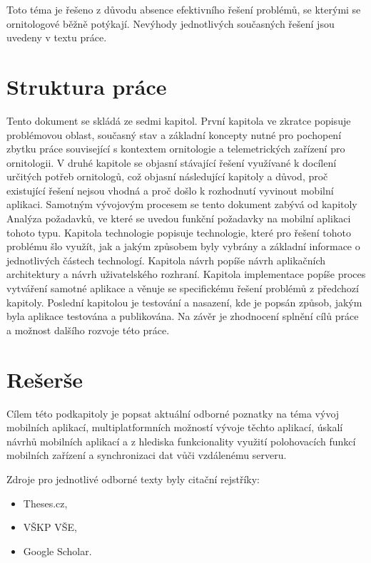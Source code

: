 Toto téma je řešeno z důvodu absence efektivního řešení problémů, se kterými se ornitologové běžně potýkají. Nevýhody jednotlivých současných řešení jsou uvedeny v textu práce.

\section*{Struktura práce}
Tento dokument se skládá ze sedmi kapitol. První kapitola ve zkratce popisuje problémovou oblast, současný stav a základní koncepty nutné pro pochopení zbytku práce související s kontextem ornitologie a telemetrických zařízení pro ornitologii. V druhé kapitole se objasní stávající řešení využívané k docílení určitých potřeb ornitologů, což objasní následující kapitoly a důvod, proč existující řešení nejsou vhodná a proč došlo k rozhodnutí vyvinout mobilní aplikaci. Samotným vývojovým procesem se tento dokument zabývá od kapitoly Analýza požadavků, ve které se uvedou funkční požadavky na mobilní aplikaci tohoto typu. Kapitola technologie popisuje technologie, které pro řešení tohoto problému šlo využít, jak a jakým způsobem byly vybrány a základní informace o jednotlivých částech technologí. Kapitola návrh popíše návrh aplikačních architektury a návrh uživatelského rozhraní. Kapitola implementace popíše proces vytváření samotné aplikace a věnuje se specifickému řešení problémů z předchozí kapitoly. Poslední kapitolou je testování a nasazení, kde je popsán způsob, jakým byla aplikace testována a publikována. Na závěr je zhodnocení splnění cílů práce a možnost dalšího rozvoje této práce.

\section*{Rešerše}

Cílem této podkapitoly je popsat aktuální odborné poznatky na téma vývoj mobilních aplikací, multiplatformních možností vývoje těchto aplikací, úskalí návrhů mobilních aplikací a z hlediska funkcionality využití polohovacích funkcí mobilních zařízení a synchronizaci dat vůči vzdálenému serveru.

Zdroje pro jednotlivé odborné texty byly citační rejstříky:

\begin{itemize}
	\item Theses.cz,
	\item VŠKP VŠE,
	\item Google Scholar.
\end{itemize}

